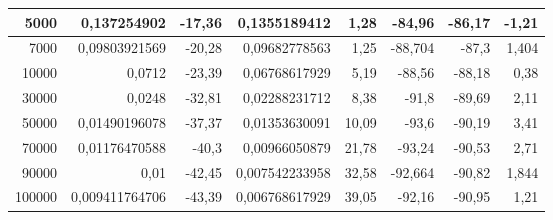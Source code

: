 \documentclass{article}
\begin{document}
\begin{table}[h!]
\begin{tabular}{|r|r|r|r|r|r|r|r|}
5000                                 & 0,137254902                  & -17,36                                                         & 0,1355189412                                               & 1,28                    & -84,96                           & -86,17                                    & -1,21                 \\ \hline
7000                                 & 0,09803921569                & -20,28                                                         & 0,09682778563                                              & 1,25                    & -88,704                          & -87,3                                     & 1,404                 \\ \hline
10000                                & 0,0712                       & -23,39                                                         & 0,06768617929                                              & 5,19                    & -88,56                           & -88,18                                    & 0,38                  \\ \hline
30000                                & 0,0248                       & -32,81                                                         & 0,02288231712                                              & 8,38                     & -91,8                            & -89,69                                    & 2,11                  \\ \hline
50000                                & 0,01490196078                & -37,37                                                         & 0,01353630091                                  & 10,09                    & -93,6                            & -90,19                                    & 3,41                  \\ \hline
70000                                & 0,01176470588                & -40,3                                                          & 0,00966050879                                              & 21,78                    & -93,24                           & -90,53                                    & 2,71                  \\ \hline
90000                                & 0,01                         & -42,45                                                         & 0,007542233958                                             & 32,58                    & -92,664                          & -90,82                                    & 1,844                 \\ \hline
100000                               & 0,009411764706               & -43,39                                                         & 0,006768617929                                             & 39,05                     & -92,16                           & -90,95                                    & 1,21                  \\ \hline
\end{tabular}
\end{table}
\end{document}
